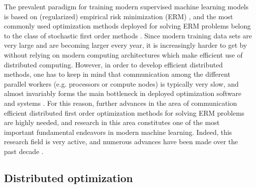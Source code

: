 \documentclass[10pt]{article}
\begin{document}
The prevalent paradigm for training modern supervised machine learning models is based on (regularized) empirical risk minimization (ERM) \citep{shai_book}, and the most commonly used optimization methods deployed for solving ERM problems belong to the class of  stochastic first order methods \citep{RobbinsMonro:1951,  Nemirovski-Juditsky-Lan-Shapiro-2009}. Since modern training data sets are very large and are becoming larger every year, it is increasingly harder to get by without relying on modern computing architectures which make efficient use of  distributed computing.  However, in order to develop efficient distributed methods, one has to keep in mind that communication among the different parallel workers (e.g. processors or compute nodes) is typically very slow, and almost invariably forms the main bottleneck in deployed optimization software and systems \citep{bekkerman2011scaling}. For this reason, further advances in the area of communication efficient distributed first order optimization methods for solving ERM problems are highly needed, and research in this area constitutes one  of the most important fundamental endeavors in modern machine learning. Indeed, this research  field is very active, and numerous advances  have been made over the past decade \citep{Seide14, Wen17, Alistarh17, Bernstein18, DIANA, Stich19, Tang19}.
 
  \subsection{Distributed optimization}
 
\end{document}

